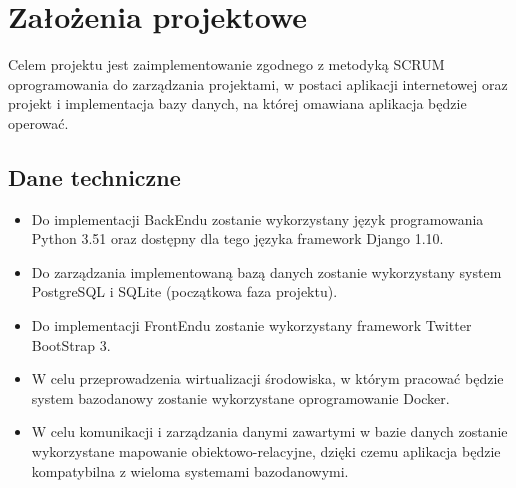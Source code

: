 \documentclass[12pt]{article}
\begin{document}
\newpage


\section{Założenia projektowe}

    Celem projektu jest zaimplementowanie zgodnego z metodyką SCRUM oprogramowania do zarządzania projektami, w postaci aplikacji internetowej oraz projekt i implementacja bazy danych, na której omawiana aplikacja będzie operować.

\subsection{Dane techniczne}

\begin{itemize}
\item
Do implementacji BackEndu zostanie wykorzystany język programowania Python 3.51 oraz dostępny dla tego języka framework Django 1.10.
\item
Do zarządzania implementowaną bazą danych zostanie wykorzystany system PostgreSQL i SQLite (początkowa faza projektu).
\item
Do implementacji FrontEndu zostanie wykorzystany framework Twitter BootStrap 3.
\item
W celu przeprowadzenia wirtualizacji środowiska, w którym pracować będzie system bazodanowy zostanie wykorzystane oprogramowanie Docker.
\item
W celu komunikacji i zarządzania danymi zawartymi w bazie danych zostanie wykorzystane mapowanie obiektowo-relacyjne, dzięki czemu aplikacja będzie kompatybilna z wieloma systemami bazodanowymi.

\end{itemize}
\end{document}
